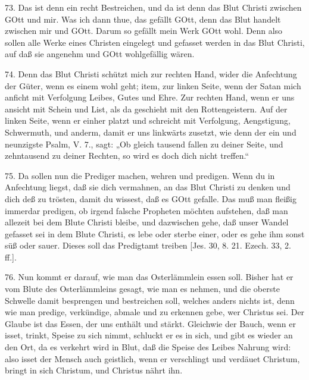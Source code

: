 73. Das ist denn ein recht Bestreichen, und da ist denn das Blut Christi zwischen GOtt und mir. Was ich dann thue, das gefällt GOtt, denn das Blut handelt zwischen mir und GOtt. Darum so gefällt mein Werk GOtt wohl. Denn also sollen alle Werke eines Christen eingelegt und gefasset werden in das Blut Christi, auf daß sie angenehm und GOtt wohlgefällig wären.

74. Denn das Blut Christi schützt mich zur rechten Hand, wider die Anfechtung der Güter, wenn es einem wohl geht; item, zur linken Seite, wenn der Satan mich anficht mit Verfolgung Leibes, Gutes und Ehre. Zur rechten Hand, wenn er uns ansicht mit Schein und List, als da geschieht mit den Rottengeistern. Auf der linken Seite, wenn er einher platzt und schreicht mit Verfolgung, Aengstigung, Schwermuth, und anderm, damit er uns linkwärts zusetzt, wie denn der ein und neunzigste Psalm, V. 7., sagt: „Ob gleich tausend fallen zu deiner Seite, und zehntausend zu deiner Rechten, so wird es doch dich nicht treffen.“

75. Da sollen nun die Prediger machen, wehren und predigen. Wenn du in Anfechtung liegst, daß sie dich vermahnen, an das Blut Christi zu denken und dich deß zu trösten, damit du wissest, daß es GOtt gefalle. Das muß man fleißig immerdar predigen, ob irgend falsche Propheten möchten aufstehen, daß man allezeit bei dem Blute Christi bleibe, und dazwischen gehe, daß unser Wandel gefasset sei in dem Blute Christi, es lebe oder sterbe einer, oder es gehe ihm sonst süß oder sauer. Dieses soll das Predigtamt treiben [Jes. 30, 8. 21. Ezech. 33, 2. ff.].

76. Nun kommt er darauf, wie man das Osterlämmlein essen soll. Bisher hat er vom Blute des Osterlämmleins gesagt, wie man es nehmen, und die oberste Schwelle damit besprengen und bestreichen soll, welches anders nichts ist, denn wie man predige, verkündige, abmale und zu erkennen gebe, wer Christus sei. Der Glaube ist das Essen, der uns enthält und stärkt. Gleichwie der Bauch, wenn er isset, trinkt, Speise zu sich nimmt, schluckt er es in sich, und gibt es wieder an den Ort, da es verkehrt wird in Blut, daß die Speise des Leibes Nahrung wird: also isset der Mensch auch geistlich, wenn er verschlingt und verdäuet Christum, bringt in sich Christum, und Christus nährt ihn.


